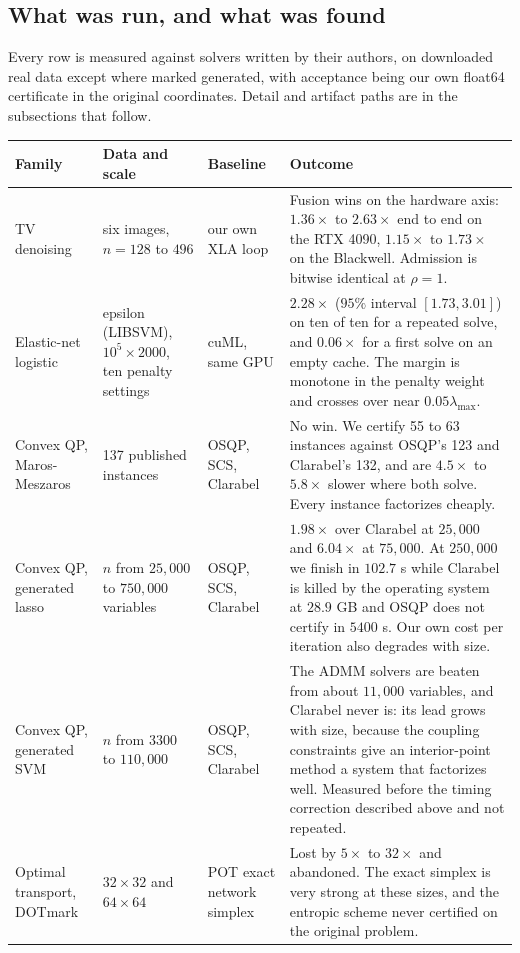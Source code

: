\subsection{What was run, and what was found}
\label{app:log:scoreboard}

Every row is measured against solvers written by their authors, on downloaded
real data except where marked generated, with acceptance being our own
float64 certificate in the original coordinates. Detail and artifact paths are
in the subsections that follow.

\begin{center}
\small
\begin{tabular}{p{2.5cm}p{2.6cm}p{2.2cm}p{6.1cm}}
\toprule
Family & Data and scale & Baseline & Outcome \\
\midrule
TV denoising & six images, $n=128$ to $496$ & our own XLA loop & Fusion wins on the hardware axis: $1.36\times$ to $2.63\times$ end to end on the RTX 4090, $1.15\times$ to $1.73\times$ on the Blackwell. Admission is bitwise identical at $\rho=1$. \\
\addlinespace
Elastic-net logistic & epsilon (LIBSVM), $10^5\times2000$, ten penalty settings & cuML, same GPU & $2.28\times$ ($95\%$ interval $[1.73, 3.01]$) on ten of ten for a repeated solve, and $0.06\times$ for a first solve on an empty cache. The margin is monotone in the penalty weight and crosses over near $0.05\lambda_{\max}$. \\
\addlinespace
Convex QP, Maros-Meszaros & 137 published instances & OSQP, SCS, Clarabel & No win. We certify 55 to 63 instances against OSQP's 123 and Clarabel's 132, and are $4.5\times$ to $5.8\times$ slower where both solve. Every instance factorizes cheaply. \\
\addlinespace
Convex QP, generated lasso & $n$ from $25{,}000$ to $750{,}000$ variables & OSQP, SCS, Clarabel & $1.98\times$ over Clarabel at $25{,}000$ and $6.04\times$ at $75{,}000$. At $250{,}000$ we finish in $102.7$ s while Clarabel is killed by the operating system at $28.9$ GB and OSQP does not certify in $5400$ s. Our own cost per iteration also degrades with size. \\
\addlinespace
Convex QP, generated SVM & $n$ from $3300$ to $110{,}000$ & OSQP, SCS, Clarabel & The ADMM solvers are beaten from about $11{,}000$ variables, and Clarabel never is: its lead grows with size, because the coupling constraints give an interior-point method a system that factorizes well. Measured before the timing correction described above and not repeated. \\
\addlinespace
Optimal transport, DOTmark & $32\times32$ and $64\times64$ & POT exact network simplex & Lost by $5\times$ to $32\times$ and abandoned. The exact simplex is very strong at these sizes, and the entropic scheme never certified on the original problem. \\
\bottomrule
\end{tabular}
\end{center}

